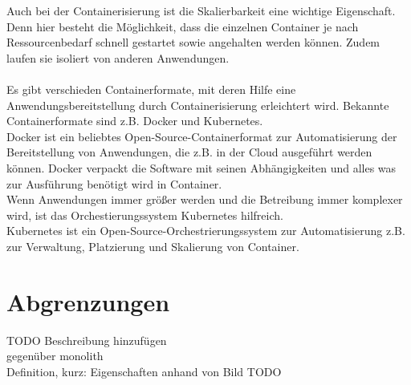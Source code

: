 Auch bei der Containerisierung ist die Skalierbarkeit eine wichtige Eigenschaft. Denn hier besteht die Möglichkeit, dass die einzelnen Container je nach Ressourcenbedarf schnell gestartet sowie angehalten werden können. Zudem laufen sie isoliert von anderen Anwendungen.\\
\\
Es gibt verschieden Containerformate, mit deren Hilfe eine Anwendungsbereitstellung durch Containerisierung erleichtert wird. Bekannte Containerformate sind z.B. Docker und Kubernetes.\\
Docker ist ein beliebtes Open-Source-Containerformat zur Automatisierung der Bereitstellung von Anwendungen, die z.B. in der Cloud ausgeführt werden können. Docker verpackt die Software mit seinen Abhängigkeiten und alles was zur Ausführung benötigt wird in Container.\\
Wenn Anwendungen immer größer werden und die Betreibung immer komplexer wird, ist das Orchestierungssystem Kubernetes hilfreich.\\
Kubernetes ist ein Open-Source-Orchestrierungssystem zur Automatisierung z.B. zur Verwaltung, Platzierung und Skalierung von Container.

\section{Abgrenzungen}
TODO Beschreibung hinzufügen\\
gegenüber monolith\\
Definition, kurz: Eigenschaften anhand von Bild TODO\\

